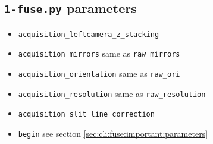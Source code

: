 \subsection{\texttt{1-fuse.py} parameters}
\label{sec:cli:parameters:fuse}



\begin{itemize}
\itemsep -0.5ex
\item \texttt{acquisition\_leftcamera\_z\_stacking}
\item \texttt{acquisition\_mirrors} same as \texttt{raw\_mirrors}
\item \texttt{acquisition\_orientation} same as \texttt{raw\_ori}
\item \texttt{acquisition\_resolution} same as \texttt{raw\_resolution}
\item \texttt{acquisition\_slit\_line\_correction}
\item \texttt{begin} see section \ref{sec:cli:fuse:important:parameters}


\end{itemize}
